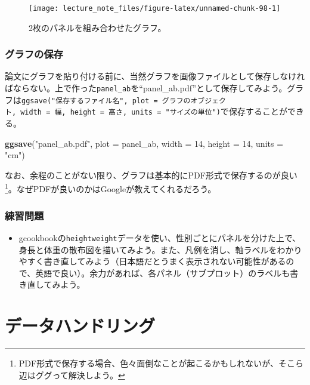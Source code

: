 \documentclass[]{book}
\newenvironment{Shaded}{\begin{snugshade}}{\end{snugshade}}
\newcommand{\KeywordTok}[1]{\textcolor[rgb]{0.13,0.29,0.53}{\textbf{#1}}}
\newcommand{\DataTypeTok}[1]{\textcolor[rgb]{0.13,0.29,0.53}{#1}}
\newcommand{\DecValTok}[1]{\textcolor[rgb]{0.00,0.00,0.81}{#1}}
\newcommand{\StringTok}[1]{\textcolor[rgb]{0.31,0.60,0.02}{#1}}
\newcommand{\NormalTok}[1]{#1}
\providecommand{\tightlist}{%
  \setlength{\itemsep}{0pt}\setlength{\parskip}{0pt}}
\let\rmarkdownfootnote\footnote%
\def\footnote{\protect\rmarkdownfootnote}
\begin{document}
\begin{figure}

{\centering \texttt{[image: lecture\_note\_files/figure-latex/unnamed-chunk-98-1]} 

}

\caption{2枚のパネルを組み合わせたグラフ。}\label{fig:unnamed-chunk-98}
\end{figure}

\section{グラフの保存}

論文にグラフを貼り付ける前に、当然グラフを画像ファイルとして保存しなければならない。上で作った\texttt{panel\_ab}を``panel\_ab.pdf''として保存してみよう。グラフは\texttt{ggsave("保存するファイル名",\ plot\ =\ グラフのオブジェクト,\ width\ =\ 幅,\ height\ =\ 高さ,\ units\ =\ "サイズの単位")}で保存することができる。

\begin{Shaded}
\begin{Highlighting}[]
\KeywordTok{ggsave}\NormalTok{(}\StringTok{"panel_ab.pdf"}\NormalTok{, }\DataTypeTok{plot =}\NormalTok{ panel_ab, }\DataTypeTok{width =} \DecValTok{14}\NormalTok{, }\DataTypeTok{height =} \DecValTok{14}\NormalTok{, }\DataTypeTok{units =} \StringTok{"cm"}\NormalTok{)}
\end{Highlighting}
\end{Shaded}

なお、余程のことがない限り、グラフは基本的にPDF形式で保存するのが良い\footnote{PDF形式で保存する場合、色々面倒なことが起こるかもしれないが、そこら辺はググって解決しよう。}。なぜPDFが良いのかはGoogleが教えてくれるだろう。

\section{練習問題}\label{-5}

\begin{itemize}
\tightlist
\item
  gcookbookの\texttt{heightweight}データを使い、性別ごとにパネルを分けた上で、身長と体重の散布図を描いてみよう。また、凡例を消し、軸ラベルをわかりやすく書き直してみよう（日本語だとうまく表示されない可能性があるので、英語で良い）。余力があれば、各パネル（サブプロット）のラベルも書き直してみよう。
\end{itemize}

\part*{データハンドリング}\label{part-}
\end{document}
